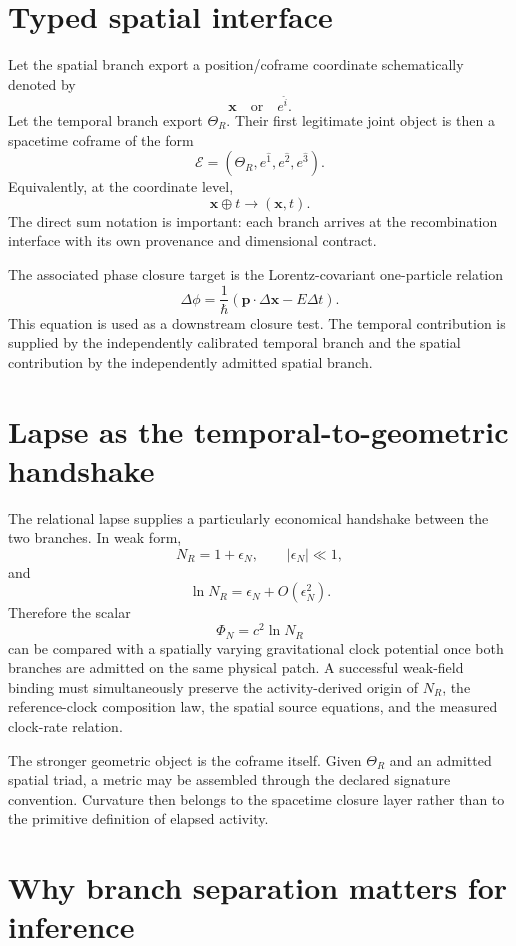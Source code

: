 \documentclass[11pt]{book}
\begin{document}
\section{Typed spatial interface}

Let the spatial branch export a position/coframe coordinate schematically denoted by
\[
\mathbf x
\quad\text{or}\quad
e^{\hat i}.
\]
Let the temporal branch export \(\Theta_R\). Their first legitimate joint object is then a spacetime coframe of the form
\[
\boxed{
\mathcal E
=
\left(\Theta_R,e^{\hat1},e^{\hat2},e^{\hat3}\right).
}
\]
Equivalently, at the coordinate level,
\[
\boxed{
\mathbf x\oplus t
\longrightarrow
(\mathbf x,t).
}
\]
The direct sum notation is important: each branch arrives at the recombination interface with its own provenance and dimensional contract.

The associated phase closure target is the Lorentz-covariant one-particle relation
\[
\boxed{
\Delta\phi
=
\frac{1}{\hbar}
\left(\mathbf p\cdot\Delta\mathbf x-E\Delta t\right).
}
\]
This equation is used as a downstream closure test. The temporal contribution is supplied by the independently calibrated temporal branch and the spatial contribution by the independently admitted spatial branch.

\section{Lapse as the temporal-to-geometric handshake}

The relational lapse supplies a particularly economical handshake between the two branches. In weak form,
\[
N_R=1+\epsilon_N,
\qquad
|\epsilon_N|\ll1,
\]
and
\[
\ln N_R=\epsilon_N+O(\epsilon_N^2).
\]
Therefore the scalar
\[
\Phi_N=c^2\ln N_R
\]
can be compared with a spatially varying gravitational clock potential once both branches are admitted on the same physical patch. A successful weak-field binding must simultaneously preserve the activity-derived origin of \(N_R\), the reference-clock composition law, the spatial source equations, and the measured clock-rate relation.

The stronger geometric object is the coframe itself. Given \(\Theta_R\) and an admitted spatial triad, a metric may be assembled through the declared signature convention. Curvature then belongs to the spacetime closure layer rather than to the primitive definition of elapsed activity.

\section{Why branch separation matters for inference}
\end{document}
